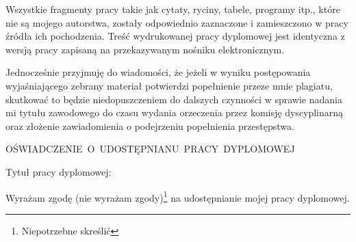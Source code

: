 \medskip
\textmd{Wszystkie fragmenty pracy takie jak cytaty, ryciny, 
tabele, programy itp., które nie są mojego autorstwa, zostały odpowiednio zaznaczone i 
zamieszczono w pracy źródła ich pochodzenia. 
Treść wydrukowanej pracy dyplomowej jest identyczna z wersją pracy zapisaną na przekazywanym nośniku elektronicznym.}

\medskip
\textmd{Jednocześnie przyjmuję do wiadomości, że jeżeli w wyniku postępowania wyjaśniającego zebrany materiał
potwierdzi popełnienie przeze mnie plagiatu, skutkować to będzie niedopuszczeniem do dalszych czynności w sprawie 
nadania mi tytułu zawodowego do czasu wydania orzeczenia przez komisję dyscyplinarną oraz złożenie zawiadomienia 
o podejrzeniu popełnienia przestępstwa.}

\vspace*{30pt}
\begin{flushright}
  
  \vspace*{-2pt}
\end{flushright}




\cleardoublepage
{}
\thispagestyle{plain}

{}

\oswiadczenieHeader

\vspace*{80pt}
\begin{center}
  OŚWIADCZENIE~O~UDOSTĘPNIANU~PRACY~DYPLOMOWEJ
\end{center}

\vspace*{30pt}
\begin{flushright}
  \parbox{400pt}{
    \textmd{Tytuł pracy dyplomowej:}
    
    \bigskip
    \textmd{\large \@title}
  }
\end{flushright}

\vspace*{30pt}
\normalsize
\textmd{Wyrażam zgodę (nie wyrażam zgody)\footnote{\label{Wyrazam zgodne} Niepotrzebne skreślić} na udostępnianie mojej pracy dyplomowej.}

\vspace*{30pt}
\begin{flushright}
  
  \vspace*{-2pt}
\end{flushright}


\restoregeometry
\makeatother
